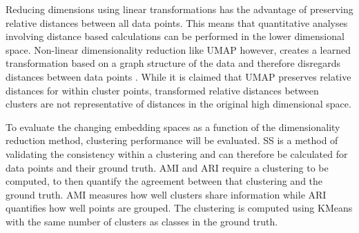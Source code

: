 Reducing dimensions using linear transformations has the advantage of preserving relative distances between all data points.
This means that quantitative analyses involving distance based calculations can be performed in the lower dimensional space.
Non-linear dimensionality reduction like UMAP however, creates a learned transformation based on a graph structure of the data and therefore disregards distances between data points \cite{mcinnes_umap_2020}.
While it is claimed that UMAP preserves relative distances for within cluster points, transformed relative distances between clusters are not representative of distances in the original high dimensional space.

To evaluate the changing embedding spaces as a function of the dimensionality reduction method, clustering performance will be evaluated. 
SS is a method of validating the consistency within a clustering and can therefore be calculated for data points and their ground truth.
AMI and ARI require a clustering to be computed, to then quantify the agreement between that clustering and the ground truth.
AMI measures how well clusters share information while ARI quantifies how well points are grouped.
The clustering is computed using KMeans with the same number of clusters as classes in the ground truth. 



